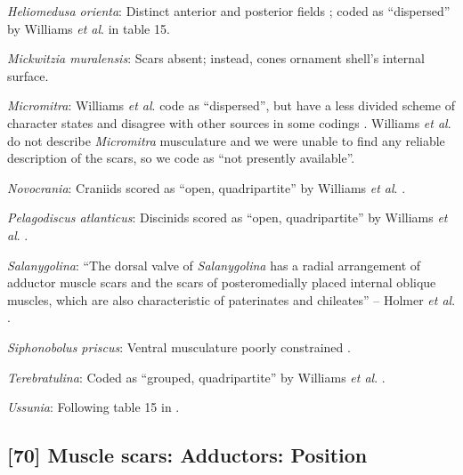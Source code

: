 \documentclass[openany]{book}
\theoremstyle{definition}
\theoremstyle{definition}
\theoremstyle{definition}
\theoremstyle{remark}
\begin{document}
\hypertarget{Heliomedusa_orienta-coding-69}{}
\emph{Heliomedusa orienta}: Distinct anterior and posterior fields
\citep{Chen2007Reinterpretationof}; coded as ``dispersed'' by Williams
\emph{et al}. \citeyearpar{Williams2000LinguliformeaCraniiformea} in
table 15.

\hypertarget{Mickwitzia_muralensis-coding-69}{}
\emph{Mickwitzia muralensis}: Scars absent; instead, cones ornament
shell's internal surface.

\hypertarget{Micromitra-coding-69}{}
\emph{Micromitra}: Williams \emph{et al}.
\citeyearpar{Williams1998Thediversity} code as ``dispersed'', but have a
less divided scheme of character states and disagree with other sources
in some codings \citep[e.g.][in
Kutorginates]{Bassett2001Functionalmorphology}. Williams \emph{et al}.
\citeyearpar{Williams2000LinguliformeaCraniiformea} do not describe
\emph{Micromitra} musculature and we were unable to find any reliable
description of the scars, so we code as ``not presently available''.

\hypertarget{Novocrania-coding-69}{}
\emph{Novocrania}: Craniids scored as ``open, quadripartite'' by
Williams \emph{et al}. \citeyearpar{Williams1996Asupra}.

\hypertarget{Pelagodiscus_atlanticus-coding-69}{}
\emph{Pelagodiscus atlanticus}: Discinids scored as ``open,
quadripartite'' by Williams \emph{et al}.
\citeyearpar{Williams1996Asupra}.

\hypertarget{Salanygolina-coding-69}{}
\emph{Salanygolina}: ``The dorsal valve of \emph{Salanygolina} has a
radial arrangement of adductor muscle scars and the scars of
posteromedially placed internal oblique muscles, which are also
characteristic of paterinates and chileates'' -- Holmer \emph{et al}.
\citeyearpar{Holmer2009Theenigmatic}.

\hypertarget{Siphonobolus_priscus-coding-69}{}
\emph{Siphonobolus priscus}: Ventral musculature poorly constrained
\citep{Williams2000LinguliformeaCraniiformea, Popov2009Earlyontogeny}.

\hypertarget{Terebratulina-coding-69}{}
\emph{Terebratulina}: Coded as ``grouped, quadripartite'' by Williams
\emph{et al}. \citeyearpar{Williams1996Asupra}.

\hypertarget{Ussunia-coding-69}{}
\emph{Ussunia}: Following table 15 in
\citet{Williams2000LinguliformeaCraniiformea}.

\subsection*{{[}70{]} Muscle scars: Adductors:
Position}\label{muscle-scars-adductors-position}
\end{document}

